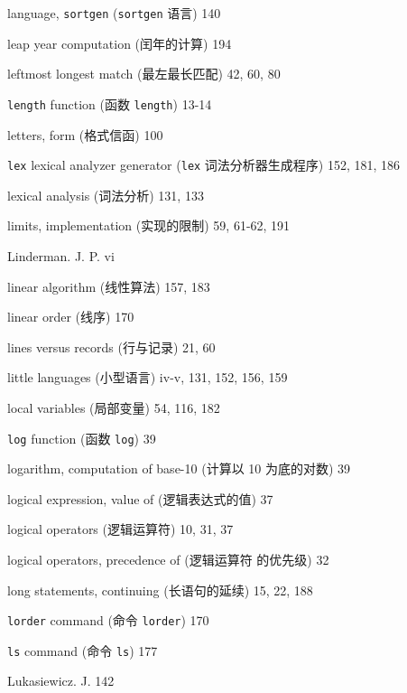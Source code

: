 \begin{multicols}{2}
\hangindent=2pc  language, \verb'sortgen' (\verb'sortgen' 语言) 140

\hangindent=2pc  leap year computation (闰年的计算) 194

\hangindent=2pc  leftmost longest match (最左最长匹配) 42, 60, 80

\hangindent=2pc  \verb'length' function (函数 \verb'length') 13-14

\hangindent=2pc  letters, form (格式信函) 100

\hangindent=2pc  \verb'lex' lexical analyzer generator
(\verb'lex' 词法分析器生成程序) 152, 181, 186

\hangindent=2pc  lexical analysis (词法分析) 131, 133

\hangindent=2pc  limits, implementation (实现的限制) 59, 61-62, 191

\hangindent=2pc  Linderman. J. P. vi

\hangindent=2pc  linear algorithm (线性算法) 157, 183

\hangindent=2pc  linear order (线序) 170

\hangindent=2pc  lines versus records (行与记录) 21, 60

\hangindent=2pc  little languages (小型语言) iv-v, 131, 152, 156, 159

\hangindent=2pc  local variables (局部变量) 54, 116, 182

\hangindent=2pc  \verb'log' function (函数 \verb'log') 39

\hangindent=2pc  logarithm, computation of base-10 (计算以 10
为底的对数) 39

\hangindent=2pc  logical expression, value of (逻辑表达式的值) 37

\hangindent=2pc  logical operators (逻辑运算符) 10, 31, 37

\hangindent=2pc  logical operators, precedence of (逻辑运算符
的优先级) 32

\hangindent=2pc  long statements, continuing (长语句的延续)
15, 22, 188

\hangindent=2pc  \verb'lorder' command (命令 \verb'lorder') 170

\hangindent=2pc  \verb'ls' command (命令 \verb'ls') 177

\hangindent=2pc  Lukasiewicz. J. 142


\end{multicols}
